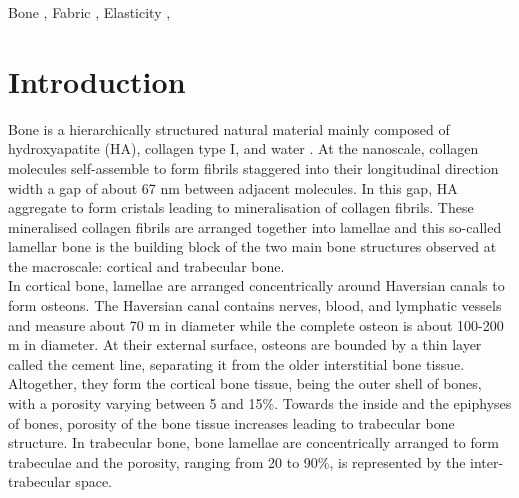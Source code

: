 \documentclass[a4paper,fleqn]{DC_ArtStyle}
\begin{document}
	\begin{keywords}
		Bone \sep%
		Fabric \sep%
		Elasticity \sep%
	\end{keywords}
	

	\begin{NoHyper}
		\maketitle
	\end{NoHyper}
	
	
	\section{Introduction}
	Bone is a hierarchically structured natural material mainly composed of hydroxyapatite (HA), collagen type I, and water \cite{Fratzl2007NaturesHM}.
	At the nanoscale, collagen molecules self-assemble to form fibrils staggered into their longitudinal direction width a gap of about 67 nm between adjacent molecules.
	In this gap, HA aggregate to form cristals leading to mineralisation of collagen fibrils.
	These mineralised collagen fibrils are arranged together into lamellae and this so-called lamellar bone is the building block of the two main bone structures observed at the macroscale: cortical and trabecular bone.\\

	In cortical bone, lamellae are arranged concentrically around Haversian canals to form osteons.
	The Haversian canal contains nerves, blood, and lymphatic vessels and measure about 70 \textmu m in diameter while the complete osteon is about 100-200 \textmu m in diameter.
	At their external surface, osteons are bounded by a thin layer called the cement line, separating it from the older interstitial bone tissue.
	Altogether, they form the cortical bone tissue, being the outer shell of bones, with a porosity varying between 5 and 15\%.
	Towards the inside and the epiphyses of bones, porosity of the bone tissue increases leading to trabecular bone structure.
	In trabecular bone, bone lamellae are concentrically arranged to form trabeculae and the porosity, ranging from 20 to 90\%, is represented by the inter-trabecular space.\\
\end{document}
